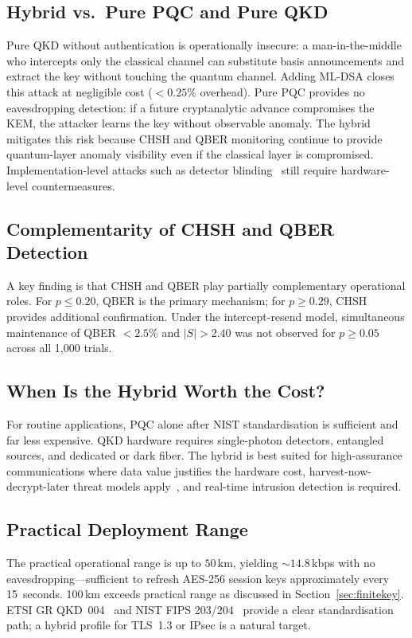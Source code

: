 \documentclass[conference]{IEEEtran}
\begin{document}
\subsection{Hybrid vs.\ Pure PQC and Pure QKD}
Pure QKD without authentication is operationally insecure: a man-in-the-middle who intercepts only the classical channel can substitute basis announcements and extract the key without touching the quantum channel. Adding ML-DSA closes this attack at negligible cost ($< 0.25\%$ overhead). Pure PQC provides no eavesdropping detection: if a future cryptanalytic advance compromises the KEM, the attacker learns the key without observable anomaly. The hybrid mitigates this risk because CHSH and QBER monitoring continue to provide quantum-layer anomaly visibility even if the classical layer is compromised. Implementation-level attacks such as detector blinding~\cite{lydersen2010,makarov2009} still require hardware-level countermeasures.

\subsection{Complementarity of CHSH and QBER Detection}
A key finding is that CHSH and QBER play partially complementary operational roles. For $p \leq 0.20$, QBER is the primary mechanism; for $p \geq 0.29$, CHSH provides additional confirmation. Under the intercept-resend model, simultaneous maintenance of QBER $< 2.5\%$ and $|S| > 2.40$ was not observed for $p \geq 0.05$ across all 1{,}000 trials.

\subsection{When Is the Hybrid Worth the Cost?}
For routine applications, PQC alone after NIST standardisation is sufficient and far less expensive. QKD hardware requires single-photon detectors, entangled sources, and dedicated or dark fiber. The hybrid is best suited for high-assurance communications where data value justifies the hardware cost, harvest-now-decrypt-later threat models apply~\cite{mosca2018}, and real-time intrusion detection is required.

\subsection{Practical Deployment Range}
The practical operational range is up to $50$\,km, yielding $\sim 14.8$\,kbps with no eavesdropping---sufficient to refresh AES-256 session keys approximately every 15~seconds. 100\,km exceeds practical range as discussed in Section~\ref{sec:finitekey}. ETSI GR QKD~004~\cite{etsi2020} and NIST FIPS 203/204~\cite{fips203,fips204} provide a clear standardisation path; a hybrid profile for TLS~1.3 or IPsec is a natural target.
\end{document}
